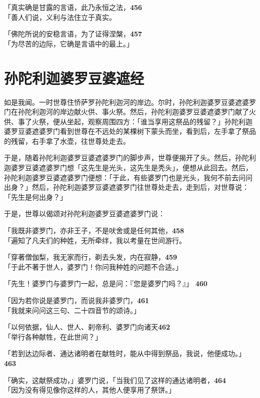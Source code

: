 「真实确是甘露的言语，此乃永恒之法，\hfill{\grayfootnotesize \textbf{456}} \\
「善人们说，义利与法住立于真实。


「佛陀所说的安稳言语，为了证得涅槃，\hfill{\grayfootnotesize \textbf{457}} \\
「为尽苦的边际，它确是言语中的最上。」


\section{孙陀利迦婆罗豆婆遮经}

如是我闻。一时世尊住㤭萨罗孙陀利迦河的岸边。尔时，孙陀利迦婆罗豆婆遮婆罗门在孙陀利迦河的岸边献火供、事火祭。然后，孙陀利迦婆罗豆婆遮婆罗门献了火供、事了火祭，便从坐起，观察周围四方：「谁当享用这祭品的残留？」孙陀利迦婆罗豆婆遮婆罗门看到世尊在不远处的某棵树下蒙头而坐，看到后，左手拿了祭品的残留，右手拿了水壶，往世尊处走去。


于是，随着孙陀利迦婆罗豆婆遮婆罗门的脚步声，世尊便揭开了头。然后，孙陀利迦婆罗豆婆遮婆罗门想「这先生是光头，这先生是秃头」，便想从此回去。然后，孙陀利迦婆罗豆婆遮婆罗门便想：「于此，有些婆罗门也是光头，我何不前去问问出身？」然后，孙陀利迦婆罗豆婆遮婆罗门往世尊处走去，走到后，对世尊说：「先生是何出身？」


于是，世尊以偈颂对孙陀利迦婆罗豆婆遮婆罗门说：

「我既非婆罗门，亦非王子，不是吠舍或是任何其他，\hfill{\grayfootnotesize \textbf{458}} \\
「遍知了凡夫们的种姓，无所牵绊，我以考量在世间游行。


「穿著僧伽梨，我无家而行，剃去头发，内在寂静，\hfill{\grayfootnotesize \textbf{459}} \\
「于此不著于世人，婆罗门！你问我种姓的问题不合适。」


「先生！婆罗门与婆罗门一起，总是问：『您是婆罗门吗？』」 \hfill{\grayfootnotesize \textbf{460}}


「因为若你说是婆罗门，而说我非婆罗门，\hfill{\grayfootnotesize \textbf{461}} \\
「我就来问问这三句、二十四音节的颂诗。」


「以何依据，仙人、世人、刹帝利、婆罗门向诸天\hfill{\grayfootnotesize \textbf{462}} \\
「举行各种献牲，在此世间？」


「若到达边际者、通达诸明者在献牲时，能从中得到祭品，我说，他便成功。」 \hfill{\grayfootnotesize \textbf{463}}

「确实，这献祭成功，」婆罗门说，「当我们见了这样的通达诸明者，\hfill{\grayfootnotesize \textbf{464}} \\
「因为没有得见像你这样的人，其他人便享用了祭饼。」


